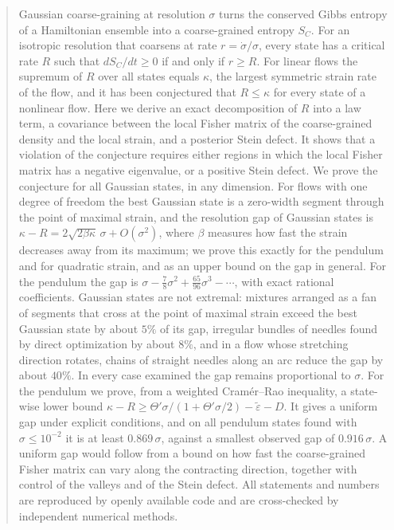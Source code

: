 \begin{abstract}
Gaussian coarse-graining at resolution $\sigma$ turns the conserved Gibbs entropy of a Hamiltonian ensemble into a coarse-grained entropy $S_C$. For an isotropic resolution that coarsens at rate $r = \dot\sigma/\sigma$, every state has a critical rate $R$ such that $dS_C/dt \geq 0$ if and only if $r \geq R$. For linear flows the supremum of $R$ over all states equals $\kappa$, the largest symmetric strain rate of the flow, and it has been conjectured that $R \leq \kappa$ for every state of a nonlinear flow. Here we derive an exact decomposition of $R$ into a law term, a covariance between the local Fisher matrix of the coarse-grained density and the local strain, and a posterior Stein defect. It shows that a violation of the conjecture requires either regions in which the local Fisher matrix has a negative eigenvalue, or a positive Stein defect. We prove the conjecture for all Gaussian states, in any dimension. For flows with one degree of freedom the best Gaussian state is a zero-width segment through the point of maximal strain, and the resolution gap of Gaussian states is $\kappa - R = 2\sqrt{2\beta\kappa}\,\sigma + O(\sigma^2)$, where $\beta$ measures how fast the strain decreases away from its maximum; we prove this exactly for the pendulum and for quadratic strain, and as an upper bound on the gap in general. For the pendulum the gap is $\sigma - \tfrac78\sigma^2 + \tfrac{65}{96}\sigma^3 - \cdots$, with exact rational coefficients. Gaussian states are not extremal: mixtures arranged as a fan of segments that cross at the point of maximal strain exceed the best Gaussian state by about $5\%$ of its gap, irregular bundles of needles found by direct optimization by about $8\%$, and in a flow whose stretching direction rotates, chains of straight needles along an arc reduce the gap by about $40\%$. In every case examined the gap remains proportional to $\sigma$. For the pendulum we prove, from a weighted Cram\'er--Rao inequality, a state-wise lower bound $\kappa - R \geq \Theta'\sigma/(1+\Theta'\sigma/2) - \tilde\varepsilon - D$. It gives a uniform gap under explicit conditions, and on all pendulum states found with $\sigma \leq 10^{-2}$ it is at least $0.869\,\sigma$, against a smallest observed gap of $0.916\,\sigma$. A uniform gap would follow from a bound on how fast the coarse-grained Fisher matrix can vary along the contracting direction, together with control of the valleys and of the Stein defect. All statements and numbers are reproduced by openly available code and are cross-checked by independent numerical methods.
\end{abstract}
